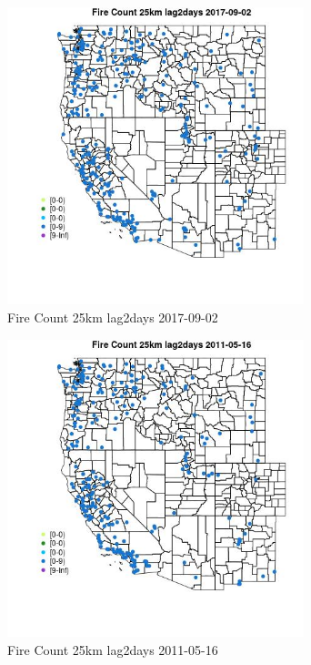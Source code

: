 \begin{figure} 
\centering  
\includegraphics[width=0.77\textwidth]{Code_Outputs/Report_ML_input_PM25_Step4_part_e_de_duplicated_aves_compiled_2019-05-21wNAs_MapObsFire_Count_25km_lag2days2017-09-02.jpg} 
\caption{\label{fig:Report_ML_input_PM25_Step4_part_e_de_duplicated_aves_compiled_2019-05-21wNAsMapObsFire_Count_25km_lag2days2017-09-02}Fire Count 25km lag2days 2017-09-02} 
\end{figure} 
 

\begin{figure} 
\centering  
\includegraphics[width=0.77\textwidth]{Code_Outputs/Report_ML_input_PM25_Step4_part_e_de_duplicated_aves_compiled_2019-05-21wNAs_MapObsFire_Count_25km_lag2days2011-05-16.jpg} 
\caption{\label{fig:Report_ML_input_PM25_Step4_part_e_de_duplicated_aves_compiled_2019-05-21wNAsMapObsFire_Count_25km_lag2days2011-05-16}Fire Count 25km lag2days 2011-05-16} 
\end{figure} 
 

